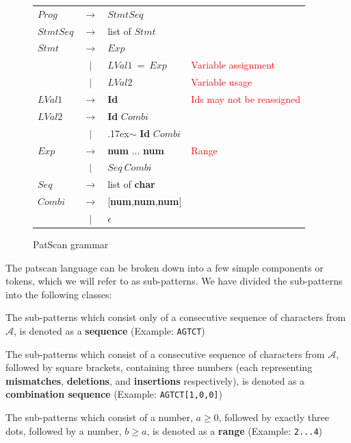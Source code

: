 \documentclass[12pt]{article}
\theoremstyle{definition}
\begin{document}
\begin{figure}[H]
\begin{center}
\begin{tabular}{|lcll|}
	\hline
	$Prog$ & $\rightarrow$ & $StmtSeq$ & \\
	$StmtSeq$ & $\rightarrow$ & list of $Stmt$ & \\
	$Stmt$ & $\rightarrow$ & $Exp$ & \\
	\enspace & $|$ & $LVal1\ =\ Exp$ &  \textcolor{red}{Variable assignment} \\
	\enspace & $|$ & $LVal2$ & \textcolor{red}{Variable usage} \\
	$LVal1$ & $\rightarrow$ & \textbf{Id} & \textcolor{red}{Ids may not be reassigned}\\
	$LVal2$ & $\rightarrow$ & \textbf{Id} $Combi$ & \\
	\enspace & $|$ & {\raise.17ex\hbox{$\scriptstyle\mathtt{\sim}$}} \textbf{Id} $Combi$ & \\
	$Exp$ & $\rightarrow$ & \textbf{num} ... \textbf{num} & \textcolor{red}{Range} \\
	\enspace & $|$ & $Seq\ Combi$ & \\
	$Seq$ & $\rightarrow$ & list of \textbf{char} & \\
	$Combi$ & $\rightarrow$ & [\textbf{num},\textbf{num},\textbf{num}] & \\
	\enspace & $|$ & $\epsilon$ & \\
	\hline
\end{tabular}
\end{center}
\caption{PatScan grammar}
\end{figure}

The patscan language can be broken down into a few simple components or tokens, which we will refer to as sub-patterns. We have divided the sub-patterns into the following classes:

The sub-patterns which consist only of a consecutive sequence of characters from $\mathcal{A}$, is denoted as a \textbf{sequence} (Example: \texttt{AGTCT})

The sub-patterns which consist of a consecutive sequence of characters from $\mathcal{A}$, followed by square brackets, containing three numbers (each representing \textbf{mismatches}, \textbf{deletions}, and \textbf{insertions} respectively), is denoted as a \textbf{combination sequence} (Example: \texttt{AGTCT[1,0,0]})

The sub-patterns which consist of a number, $a \geq 0$, followed by exactly three dots, followed by a number, $b \geq a$, is denoted as a \textbf{range} (Example: \texttt{2...4})
\end{document}
